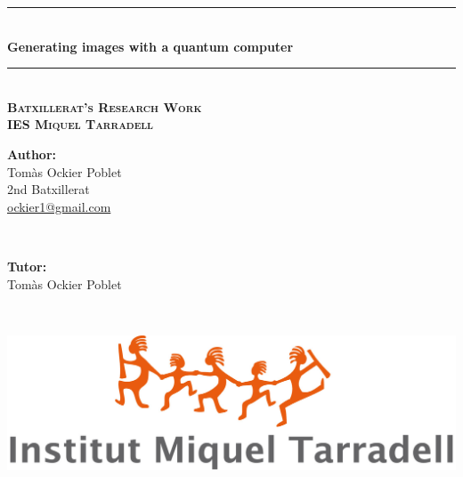 \documentclass[a4paper,12pt,arial,numbered,print,index,oneside]{book}
\newcommand{\HRule}{\rule{\linewidth}{0.5mm}} %
\begin{document}
	
	
	\begin{titlepage}
		
		\center %
		

		
		\HRule \\[0.4cm]
		{ \Huge \bfseries Generating images with a quantum computer}\\[0.1cm] 
		\HRule \\[1.5cm]
		
		\textsc{\Large \textbf{Batxillerat's Research Work}}\\[.3cm]
		
		\textsc{\large \textbf{IES Miquel Tarradell}}\\[2cm]
		
		
		\vspace{8.3cm}
		\begin{minipage}{0.48\textwidth}
			\begin{flushleft} \large
				\Large \textbf{Author:}\\[0.1cm]
				\Large Tomàs Ockier Poblet \\ 2nd Batxillerat \\ \href{mailto:ockier1@gmail.com}{ockier1@gmail.com}
			\end{flushleft}
		\end{minipage}
		~
		\begin{minipage}{0.48\textwidth}
			\begin{flushright} \large
				\Large \textbf{Tutor:} \\[0.1cm]
				\Large Tomàs Ockier Poblet 
			\end{flushright}
		\end{minipage}\\[1.5cm]
		
		
		\begin{minipage}{0.85\textwidth}
			\begin{center}
								\includegraphics[scale=0.2]{Figures/Cover/logo-tarradell.jpg}
			\end{center}
		\end{minipage}
		

\end{titlepage}
\end{document}
